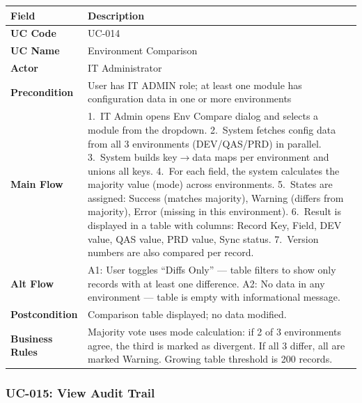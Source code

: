 \documentclass[12pt,a4paper]{report}
\begin{document}
\begin{longtable}{|>{\bfseries}p{2.8cm}|p{12cm}|}
  \hline
  \rowcolor{tableheadpeach}
  \textbf{Field} & \textbf{Description} \\ \hline
  \endhead \hline \endfoot
  UC Code       & UC-014 \\ \hline
  UC Name       & Environment Comparison \\ \hline
  Actor         & IT Administrator \\ \hline
  Precondition  & User has IT ADMIN role; at least one module has configuration data in one or more environments \\ \hline
  Main Flow     & 1.~IT Admin opens Env Compare dialog and selects a module from the dropdown.
                  2.~System fetches config data from all 3 environments (DEV/QAS/PRD) in parallel.
                  3.~System builds key$\rightarrow$data maps per environment and unions all keys.
                  4.~For each field, the system calculates the majority value (mode) across environments.
                  5.~States are assigned: Success (matches majority), Warning (differs from majority), Error (missing in this environment).
                  6.~Result is displayed in a table with columns: Record Key, Field, DEV value, QAS value, PRD value, Sync status.
                  7.~Version numbers are also compared per record. \\ \hline
  Alt Flow      & A1: User toggles ``Diffs Only'' --- table filters to show only records with at least one difference.
                  A2: No data in any environment --- table is empty with informational message. \\ \hline
  Postcondition & Comparison table displayed; no data modified. \\ \hline
  Business Rules& Majority vote uses mode calculation: if 2 of 3 environments agree, the third is marked as divergent. If all 3 differ, all are marked Warning. Growing table threshold is 200 records. \\ \hline
\end{longtable}

\subsubsection{UC-015: View Audit Trail}
\end{document}
